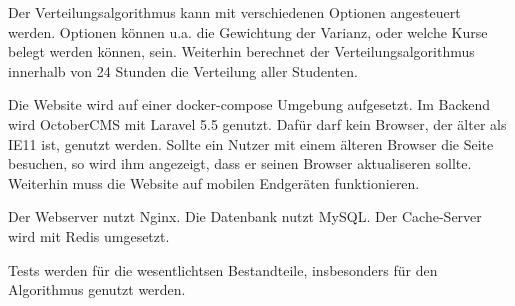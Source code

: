 \documentclass[12pt,a4paper]{article}
\begin{document}
    Der Verteilungsalgorithmus kann mit verschiedenen Optionen angesteuert werden. Optionen können u.a. die Gewichtung der Varianz, oder welche Kurse belegt werden können, sein.
    Weiterhin berechnet der Verteilungsalgorithmus innerhalb von 24 Stunden die Verteilung aller Studenten. \newline
    
    Die Website wird auf einer docker-compose Umgebung aufgesetzt.
    Im Backend wird OctoberCMS mit Laravel 5.5 genutzt.
    Dafür darf kein Browser, der älter als IE11 ist, genutzt werden.
    Sollte ein Nutzer mit einem älteren Browser die Seite besuchen, so wird ihm angezeigt, dass er seinen Browser aktualiseren sollte.
    Weiterhin muss die Website auf mobilen Endgeräten funktionieren.\newline
    
    Der Webserver nutzt Nginx.
    Die Datenbank nutzt MySQL.
    Der Cache-Server wird mit Redis umgesetzt. \newline
    
    Tests werden für die wesentlichtsen Bestandteile, insbesonders für den Algorithmus genutzt werden.
\end{document}
